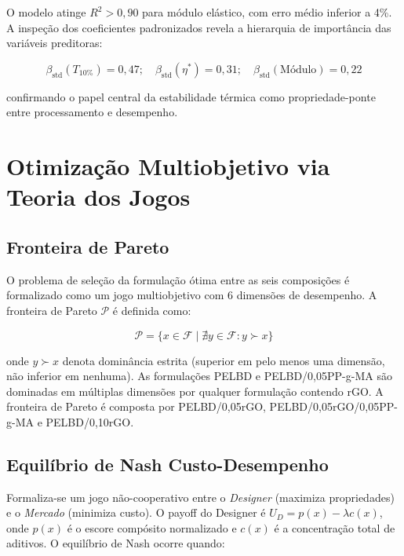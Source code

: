 \documentclass[12pt,a4paper,twoside]{article}
\begin{document}
O modelo atinge $R^2 > 0,90$ para módulo elástico, com erro médio inferior a 4\%. A inspeção dos coeficientes padronizados revela a hierarquia de importância das variáveis preditoras:

\begin{equation}
\beta_{\text{std}}(T_{10\%}) = 0,47; \quad \beta_{\text{std}}(\eta^*) = 0,31; \quad \beta_{\text{std}}(\text{Módulo}) = 0,22
\label{eq:beta_std}
\end{equation}

confirmando o papel central da estabilidade térmica como propriedade-ponte entre processamento e desempenho.

\section{Otimização Multiobjetivo via Teoria dos Jogos}

\subsection{Fronteira de Pareto}

O problema de seleção da formulação ótima entre as seis composições é formalizado como um jogo multiobjetivo com 6 dimensões de desempenho. A fronteira de Pareto $\mathcal{P}$ é definida como:

\begin{equation}
\mathcal{P} = \{x \in \mathcal{F} \mid \nexists y \in \mathcal{F}: y \succ x\}
\label{eq:pareto}
\end{equation}

onde $y \succ x$ denota dominância estrita (superior em pelo menos uma dimensão, não inferior em nenhuma). As formulações PELBD e PELBD/0,05PP-g-MA são dominadas em múltiplas dimensões por qualquer formulação contendo rGO. A fronteira de Pareto é composta por PELBD/0,05rGO, PELBD/0,05rGO/0,05PP-g-MA e PELBD/0,10rGO.

\subsection{Equilíbrio de Nash Custo-Desempenho}

Formaliza-se um jogo não-cooperativo entre o \textit{Designer} (maximiza propriedades) e o \textit{Mercado} (minimiza custo). O payoff do Designer é $U_D = p(x) - \lambda c(x)$, onde $p(x)$ é o escore compósito normalizado e $c(x)$ é a concentração total de aditivos. O equilíbrio de Nash \cite{Nash1950} ocorre quando:
\end{document}
